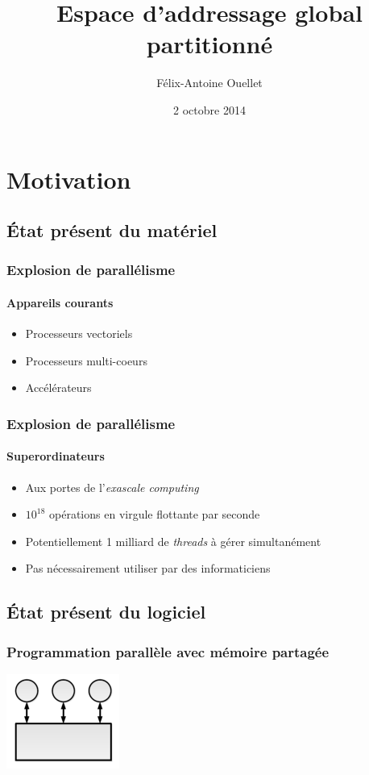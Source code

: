 \documentclass{beamer}
\author[Félix-Antoine Ouellet]{Félix-Antoine Ouellet}
\title[PGAS\hspace{2em}\insertframenumber/\inserttotalframenumber]{Espace d'addressage global partitionné}
\institute{Université de Sherbrooke}
\date{2 octobre 2014}
\begin{document}
\begin{frame}
\titlepage %
\end{frame}

\begin{frame}
\tableofcontents[hideallsubsections]
\end{frame}

\section{Motivation}
\subsection{État présent du matériel}
\begin{frame}
\frametitle{Explosion de parallélisme}
\framesubtitle{Appareils courants}
\begin{itemize}
\item Processeurs vectoriels
\item Processeurs multi-coeurs
\item Accélérateurs
\end{itemize}
\end{frame}

\begin{frame}
\frametitle{Explosion de parallélisme}
\framesubtitle{Superordinateurs}
\begin{itemize}
\item Aux portes de l'\textit{exascale computing}
\item<2-> $10^{18}$ opérations en virgule flottante par seconde
\item<3-> Potentiellement 1 milliard de \textit{threads} à gérer simultanément
\item<4-> Pas nécessairement utiliser par des informaticiens
\end{itemize}
\end{frame}

\subsection{État présent du logiciel}
\begin{frame}
\frametitle{Programmation parallèle avec mémoire partagée}
\begin{center}
\includegraphics[scale=3]{shared.png}
\end{center}
\end{frame}
\end{document}
